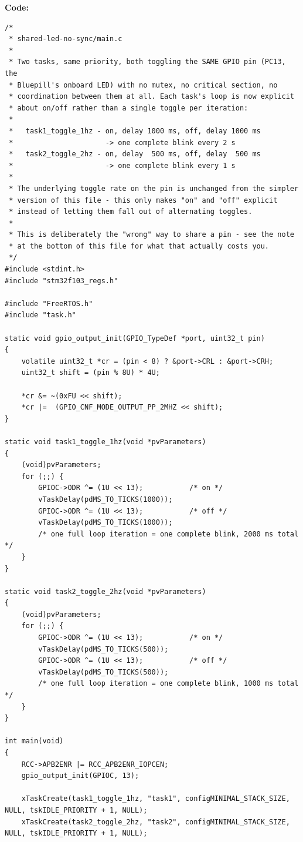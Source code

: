 ﻿\documentclass[12pt,a4paper]{article}
\begin{document}
\textbf{Code:}
\begin{lstlisting}
/*
 * shared-led-no-sync/main.c
 *
 * Two tasks, same priority, both toggling the SAME GPIO pin (PC13, the
 * Bluepill's onboard LED) with no mutex, no critical section, no
 * coordination between them at all. Each task's loop is now explicit
 * about on/off rather than a single toggle per iteration:
 *
 *   task1_toggle_1hz - on, delay 1000 ms, off, delay 1000 ms
 *                      -> one complete blink every 2 s
 *   task2_toggle_2hz - on, delay  500 ms, off, delay  500 ms
 *                      -> one complete blink every 1 s
 *
 * The underlying toggle rate on the pin is unchanged from the simpler
 * version of this file - this only makes "on" and "off" explicit
 * instead of letting them fall out of alternating toggles.
 *
 * This is deliberately the "wrong" way to share a pin - see the note
 * at the bottom of this file for what that actually costs you.
 */
#include <stdint.h>
#include "stm32f103_regs.h"

#include "FreeRTOS.h"
#include "task.h"

static void gpio_output_init(GPIO_TypeDef *port, uint32_t pin)
{
    volatile uint32_t *cr = (pin < 8) ? &port->CRL : &port->CRH;
    uint32_t shift = (pin % 8U) * 4U;

    *cr &= ~(0xFU << shift);
    *cr |=  (GPIO_CNF_MODE_OUTPUT_PP_2MHZ << shift);
}

static void task1_toggle_1hz(void *pvParameters)
{
    (void)pvParameters;
    for (;;) {
        GPIOC->ODR ^= (1U << 13);           /* on */
        vTaskDelay(pdMS_TO_TICKS(1000));
        GPIOC->ODR ^= (1U << 13);           /* off */
        vTaskDelay(pdMS_TO_TICKS(1000));
        /* one full loop iteration = one complete blink, 2000 ms total */
    }
}

static void task2_toggle_2hz(void *pvParameters)
{
    (void)pvParameters;
    for (;;) {
        GPIOC->ODR ^= (1U << 13);           /* on */
        vTaskDelay(pdMS_TO_TICKS(500));
        GPIOC->ODR ^= (1U << 13);           /* off */
        vTaskDelay(pdMS_TO_TICKS(500));
        /* one full loop iteration = one complete blink, 1000 ms total */
    }
}

int main(void)
{
    RCC->APB2ENR |= RCC_APB2ENR_IOPCEN;
    gpio_output_init(GPIOC, 13);

    xTaskCreate(task1_toggle_1hz, "task1", configMINIMAL_STACK_SIZE, NULL, tskIDLE_PRIORITY + 1, NULL);
    xTaskCreate(task2_toggle_2hz, "task2", configMINIMAL_STACK_SIZE, NULL, tskIDLE_PRIORITY + 1, NULL);


\end{lstlisting}
\end{document}
